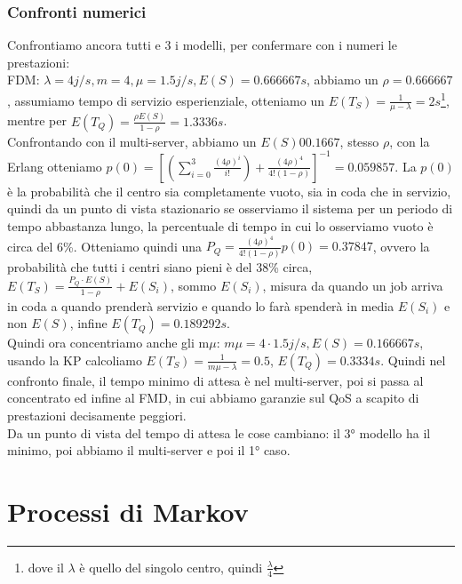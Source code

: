 \documentclass{article}
\begin{document}
\subsubsection{Confronti numerici}
Confrontiamo ancora tutti e 3 i modelli, per confermare con i numeri le prestazioni:\\
FDM: $\lambda = 4 j/s, m = 4, \mu = 1.5 j/s, E(S) = 0.666667 s$, abbiamo un $\rho = 0.666667$, assumiamo tempo di servizio esperienziale, otteniamo un $E(T_S) = \frac{1}{\mu - \lambda} = 2 s$\footnote{dove il $\lambda$ è quello del singolo centro, quindi $\frac{\lambda}{4}$}, mentre per $E(T_Q) = \frac{\rho E(S)}{1 - \rho} = 1.3336 s$.\\ Confrontando con il multi-server, abbiamo un $E(S) 0 0.1667$, stesso $\rho$, con la Erlang otteniamo $p(0) = [(\sum\limits_{i=0}^{3} \frac{(4 \rho)^i}{i!}) + \frac{(4 \rho)^4}{4!(1 - \rho)}]^{-1} = 0.059857$. La $p(0)$ è la probabilità che il centro sia completamente vuoto, sia in coda che in servizio, quindi da un punto di vista stazionario se osserviamo il sistema per un periodo di tempo abbastanza lungo, la percentuale di tempo in cui lo osserviamo vuoto è circa del 6\%. Otteniamo quindi una $P_Q = \frac{(4 \rho)^4}{4!(1 - \rho)}p(0) = 0.37847$, ovvero la probabilità che tutti i centri siano pieni è del 38\% circa, $E(T_S) = \frac{P_Q\cdot E(S)}{1 - \rho} + E(S_i)$, sommo $E(S_i)$, misura da quando un job arriva in coda a quando prenderà servizio e quando lo farà spenderà in media $E(S_i)$ e non $E(S)$, infine $E(T_Q) = 0.189292 s$.\\ Quindi ora concentriamo anche gli m$\mu$: $m \mu = 4\cdot 1.5 j/s, E(S) = 0.166667s$, usando la KP calcoliamo $E(T_S) = \frac{1}{m \mu - \lambda} = 0.5$, $E(T_Q) = 0.3334 s$. Quindi nel confronto finale, il tempo minimo di attesa è nel multi-server, poi si passa al concentrato ed infine al FMD, in cui abbiamo garanzie sul QoS a scapito di prestazioni decisamente peggiori.\\ Da un punto di vista del tempo di attesa le cose cambiano: il 3° modello ha il minimo, poi abbiamo il multi-server e poi il 1° caso.
\section{Processi di Markov}
\end{document}
